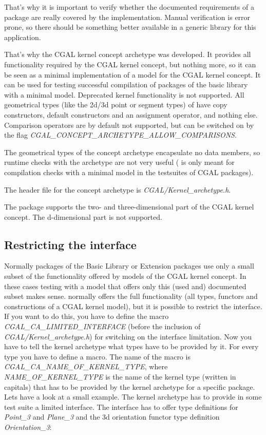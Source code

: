 That's why it is important to verify whether the documented requirements of a package are really covered
by the implementation. Manual verification is error prone, so there should be something better available
in a generic library for this application.

That's why the CGAL kernel concept archetype  was developed. It provides all functionality
required by the CGAL kernel concept, but nothing more, so it can be seen as a minimal
implementation of a model for the CGAL kernel concept.
It can be used for testing successful compilation of packages of the basic library with a minimal
model. Deprecated kernel functionality is not supported. All geometrical types (like the 2d/3d point or segment types)
of  have
copy constructors, default constructors and an assignment operator, and nothing else.
Comparison operators are by default not supported, but can be switched on by the flag
{\em CGAL\_CONCEPT\_ARCHETYPE\_ALLOW\_COMPARISONS}.

The geometrical types of the concept archetype encapsulate no data members, so runtime checks with the archetype
are not very useful ( is only meant for compilation checks with a minimal model in the testsuites
of CGAL packages).

The header file for the concept archetype is {\em CGAL/Kernel\_archetype.h}.

The package supports the two- and three-dimensional part of the CGAL kernel concept. The d-dimensional
part is not supported.

\subsection{Restricting the interface}

Normally packages of the Basic Library or Extension packages use only a small subset of the functionality offered
by models of the CGAL kernel concept. In these cases testing with a model that offers only this (used and) documented subset
makes sense.  normally offers the full functionality (all types, functors and constructions
of a CGAL kernel model), but it is possible to restrict the interface.\\
If you want to do this, you have to define the macro {\em CGAL\_CA\_LIMITED\_INTERFACE} (before the inclusion
of {\em CGAL/Kernel\_archetype.h}) for switching on the interface limitation. Now you have to tell the kernel
archetype what types have to be provided by it. For every type you have to define a macro.
The name of the macro is {\em CGAL\_CA\_NAME\_OF\_KERNEL\_TYPE}, where {\em NAME\_OF\_KERNEL\_TYPE} is the name
of the kernel type (written in capitals) that has to be provided by the kernel archetype for a specific package.
Lets have a look at a small example. The kernel archetype has to provide in some test suite a limited interface.
The interface has to offer type definitions for {\em Point\_3} and {\em Plane\_3} and the
3d orientation functor type definition {\em Orientation\_3}:


